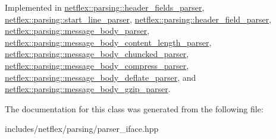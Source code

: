 Implemented in \hyperlink{classnetflex_1_1parsing_1_1header__fields__parser_a255c485598692bee975e6db49d8ec13c}{netflex\+::parsing\+::header\+\_\+fields\+\_\+parser}, \hyperlink{classnetflex_1_1parsing_1_1start__line__parser_a663858012ee38e99d0c39444221bf4b5}{netflex\+::parsing\+::start\+\_\+line\+\_\+parser}, \hyperlink{classnetflex_1_1parsing_1_1header__field__parser_acdb399c2199106c99a2fcb4db1fbebca}{netflex\+::parsing\+::header\+\_\+field\+\_\+parser}, \hyperlink{classnetflex_1_1parsing_1_1message__body__parser_adb35dd992073f27e5c85d13453cd3db6}{netflex\+::parsing\+::message\+\_\+body\+\_\+parser}, \hyperlink{classnetflex_1_1parsing_1_1message__body__content__length__parser_a57265653361c2c29919799e2a7346a48}{netflex\+::parsing\+::message\+\_\+body\+\_\+content\+\_\+length\+\_\+parser}, \hyperlink{classnetflex_1_1parsing_1_1message__body__chuncked__parser_ac7a1529423ff3e606f418a6c5853e47d}{netflex\+::parsing\+::message\+\_\+body\+\_\+chuncked\+\_\+parser}, \hyperlink{classnetflex_1_1parsing_1_1message__body__compress__parser_a75fc64c9be07c57fd44028862933387b}{netflex\+::parsing\+::message\+\_\+body\+\_\+compress\+\_\+parser}, \hyperlink{classnetflex_1_1parsing_1_1message__body__deflate__parser_af7ee85cc5edee4e1f6cf34bebccceaa4}{netflex\+::parsing\+::message\+\_\+body\+\_\+deflate\+\_\+parser}, and \hyperlink{classnetflex_1_1parsing_1_1message__body__gzip__parser_a5adc84970912dcd766bb559dff7fe582}{netflex\+::parsing\+::message\+\_\+body\+\_\+gzip\+\_\+parser}.



The documentation for this class was generated from the following file\+:\begin{DoxyCompactItemize}
\item 
includes/netflex/parsing/parser\+\_\+iface.\+hpp\end{DoxyCompactItemize}
